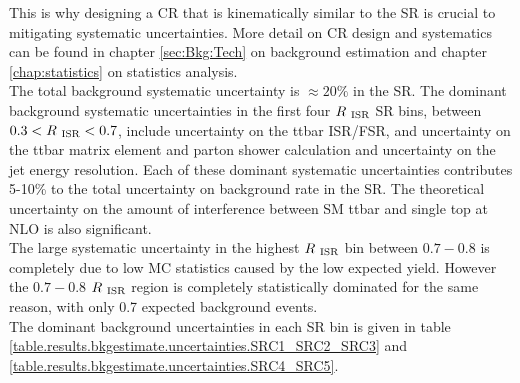 \indent This is why designing a CR that is kinematically similar to the SR is crucial to mitigating systematic uncertainties.  More detail on CR design and systematics can be found in chapter \ref{sec:Bkg:Tech} on background estimation and chapter \ref{chap:statistics} on statistics analysis.  \\



\indent The total background systematic uncertainty is $\approx 20\%$ in the SR.  The dominant background systematic uncertainties in the first four $R_{~\mathrm{ISR}}$ SR bins, between $0.3 < R_{~\mathrm{ISR}} < 0.7$, include uncertainty on the ttbar ISR/FSR, and uncertainty on the ttbar matrix element and parton shower calculation and uncertainty on the jet energy resolution.  Each of these dominant systematic uncertainties contributes 5-10\% to the total uncertainty on background rate in the SR.  The theoretical uncertainty on the amount of interference between SM ttbar and single top at NLO is also significant.  \\

\indent The large systematic uncertainty in the highest $R_{~\mathrm{ISR}}$ bin between $0.7-0.8$ is completely due to low MC statistics caused by the low expected yield.  However the $0.7-0.8$ $R_{~\mathrm{ISR}}$ region is completely statistically dominated for the same reason, with only 0.7 expected background events.  \\

\indent The dominant background uncertainties in each SR bin is given in table \ref{table.results.bkgestimate.uncertainties.SRC1_SRC2_SRC3} and \ref{table.results.bkgestimate.uncertainties.SRC4_SRC5}.  \\


